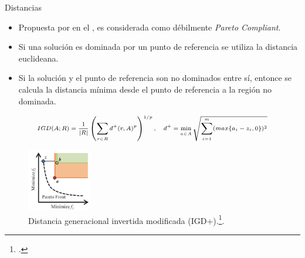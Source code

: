 \documentclass{beamer}
\begin{document}
\begin{frame}{Distancias}
\begin{itemize}
\justifying
\scriptsize
\item Propuesta por \citeauthor{Joel:IGDPlus_And_GDPlus} en el \citeyear{Joel:IGDPlus_And_GDPlus}, es considerada como débilmente \textit{Pareto Compliant}.
\item Si una solución es dominada por un punto de referencia se utiliza la distancia euclideana.
\item Si la solución y el punto de referencia son no dominados entre sí, entonce se calcula la distancia mínima desde el punto de referencia a la región no dominada.
\end{itemize}
\begin{equation*}
\scriptsize
\begin{split}
IGD(A; R) = \frac{1}{|R|} \left (   \sum_{r \in R} d^+(r, A)^p \right)^{1/p}, \quad d^+ = \min_{a \in A} \sqrt{\sum_{i=1}^m (max\{ a_i - z_i, 0\})^2}
\end{split}
\end{equation*}


\begin{figure}[H]
\centering
\includegraphics[width=0.25\textwidth]{igd_3.png}
\caption{\scriptsize Distancia generacional invertida modificada (IGD+).\footcite{ishibuchi2016sensitivity}.}
\end{figure}
\end{frame}
\end{document}
